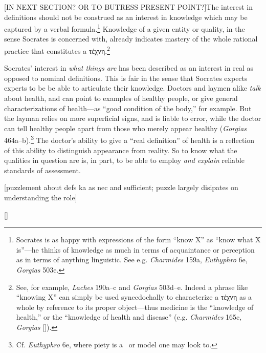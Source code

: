 \documentclass[11pt,letterpaper,oneside]{amsart} %
\begin{document}
[IN NEXT SECTION? OR TO BUTRESS PRESENT POINT?]The interest in definitions should not be construed as an interest in knowledge which may be captured by a verbal formula.\footnote{Socrates is as happy with expressions of the form ``know X'' as ``know what X is''---he thinks of knowledge as much in terms of acquaintance or perception as in terms of anything linguistic. See e.g. \emph{Charmides} 159a, \emph{Euthyphro} 6e, \emph{Gorgias} 503e.} Knowledge of a given entity or quality, in the sense Socrates is concerned with, already indicates mastery of the whole rational practice that constitutes a τέχνη.\footnote{See, for example, \emph{Laches} 190a--c and \emph{Gorgias} 503d--e. Indeed a phrase like ``knowing X'' can simply be used synecdochally to characterize a τέχνη as a whole by reference to its proper object---thus medicine is the ``knowledge of health,'' or the ``knowledge of health and disease'' (e.g. \emph{Charmides} 165c, \emph{Gorgias} []).}


Socrates' interest in \emph{what things are} has been described as an interest in real as opposed to nominal definitions. This is fair in the sense that Socrates expects experts to be be able to articulate their knowledge. Doctors and laymen alike \emph{talk} about health, and can point to examples of healthy people, or give general characterizations of health---as ``good condition of the body,'' for example. But the layman relies on more superficial signs, and is liable to error, while the doctor can tell healthy people apart from those who merely appear healthy (\emph{Gorgias} 464a--b).\footnote{Cf. \emph{Euthyphro} 6e, where piety is a \paradeigma\ or model one may look to.} The doctor's ability to give a ``real definition'' of health is a reflection of this ability to distinguish appearance from reality. So to know what the qualities in question are is, in part, to be able to employ \emph{and explain} reliable standards of assessment. %




[puzzlement about defs ka as nec and sufficient; puzzle largely disipates on understanding the role]






[]
\end{document}
